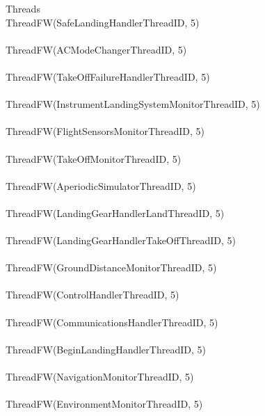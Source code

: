 %
\begin{circus}
\circprocess Threads \circdef  \\
\circblockopen
ThreadFW(SafeLandingHandlerThreadID, 5) \\
\interleave \\
ThreadFW(ACModeChangerThreadID, 5) \\
\interleave \\
ThreadFW(TakeOffFailureHandlerThreadID, 5) \\
\interleave \\
ThreadFW(InstrumentLandingSystemMonitorThreadID, 5) \\
\interleave \\
ThreadFW(FlightSensorsMonitorThreadID, 5) \\
\interleave \\
ThreadFW(TakeOffMonitorThreadID, 5) \\
\interleave \\
ThreadFW(AperiodicSimulatorThreadID, 5) \\
\interleave \\
ThreadFW(LandingGearHandlerLandThreadID, 5) \\
\interleave \\
ThreadFW(LandingGearHandlerTakeOffThreadID, 5) \\
\interleave \\
ThreadFW(GroundDistanceMonitorThreadID, 5) \\
\interleave \\
ThreadFW(ControlHandlerThreadID, 5) \\
\interleave \\
ThreadFW(CommunicationsHandlerThreadID, 5) \\
\interleave \\
ThreadFW(BeginLandingHandlerThreadID, 5) \\
\interleave \\
ThreadFW(NavigationMonitorThreadID, 5) \\
\interleave \\
ThreadFW(EnvironmentMonitorThreadID, 5) \\

\circblockclose
\end{circus}
%
%
